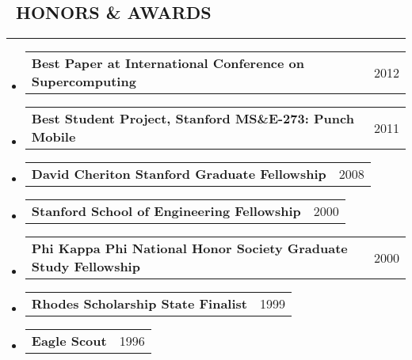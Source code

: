 \documentclass[10pt,letterpaper]{article}
\makeatletter
\newenvironment{resumesection}[1]
{%
    \subsection*{\ #1}
    \vspace{-0.4em}
    \hrule
    \vspace{+0.4em}
    \begin{itemize}
        \parskip=0.1em
}%
{%
    \end{itemize}
}%
\newcommand{\headerrowx}[2]
{\item[] \begin{tabular*}{\linewidth}{l@{\extracolsep{\fill}}r}
	#1 &
	#2 \\
\end{tabular*}}
\makeatother
\begin{document}
\begin{resumesection}{HONORS \& AWARDS}
    \headerrowx{ \textbf{Best Paper at International Conference on Supercomputing}}        {2012}
    \headerrowx{ \textbf{Best Student Project, Stanford MS\&E-273: Punch Mobile}}          {2011}
    \headerrowx{ \textbf{David Cheriton Stanford Graduate Fellowship}}                     {2008}
    \headerrowx{ \textbf{Stanford School of Engineering Fellowship}}                       {2000}
    \headerrowx{ \textbf{Phi Kappa Phi National Honor Society Graduate Study Fellowship}}  {2000}
    \headerrowx{ \textbf{Rhodes Scholarship State Finalist}}                               {1999}
    \headerrowx{ \textbf{Eagle Scout}}                                                     {1996}
\end{resumesection}
\end{document}
